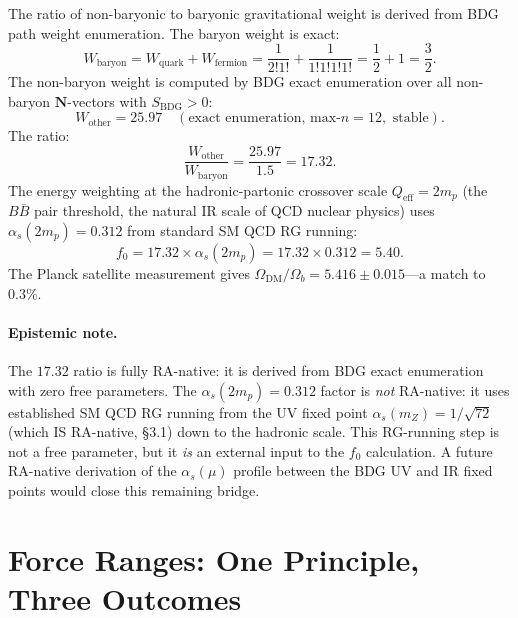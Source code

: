 \documentclass[11pt]{article}
\begin{document}
The ratio of non-baryonic to baryonic gravitational weight is derived from BDG path weight enumeration. The baryon weight is exact:
\begin{equation}
W_{\mathrm{baryon}} = W_{\mathrm{quark}}+W_{\mathrm{fermion}} = \frac{1}{2!1!}+\frac{1}{1!1!1!1!} = \frac{1}{2}+1 = \frac{3}{2}.
\end{equation}
The non-baryon weight is computed by BDG exact enumeration over all non-baryon $\mathbf{N}$-vectors with $S_{\mathrm{BDG}}>0$:
\begin{equation}
W_{\mathrm{other}} = 25.97\quad (\text{exact enumeration, max-}n=12,\text{ stable}).
\end{equation}
The ratio:
\begin{equation}
\frac{W_{\mathrm{other}}}{W_{\mathrm{baryon}}} = \frac{25.97}{1.5} = 17.32.
\end{equation}
The energy weighting at the hadronic-partonic crossover scale $Q_{\mathrm{eff}}=2m_p$ (the $B\bar B$ pair threshold, the natural IR scale of QCD nuclear physics) uses $\alpha_s(2m_p)=0.312$ from standard SM QCD RG running:
\begin{equation}
f_0 = 17.32\times\alpha_s(2m_p) = 17.32\times 0.312 = 5.40.
\end{equation}
The Planck satellite measurement gives $\Omega_{\mathrm{DM}}/\Omega_b=5.416\pm 0.015$---a match to $0.3\%$.

\paragraph{Epistemic note.} The $17.32$ ratio is fully RA-native: it is derived from BDG exact enumeration with zero free parameters. The $\alpha_s(2m_p)=0.312$ factor is \emph{not} RA-native: it uses established SM QCD RG running from the UV fixed point $\alpha_s(m_Z)=1/\sqrt{72}$ (which IS RA-native, \S3.1) down to the hadronic scale. This RG-running step is not a free parameter, but it \emph{is} an external input to the $f_0$ calculation. A future RA-native derivation of the $\alpha_s(\mu)$ profile between the BDG UV and IR fixed points would close this remaining bridge.

\section{Force Ranges: One Principle, Three Outcomes}
\label{sec:forces}
\end{document}

